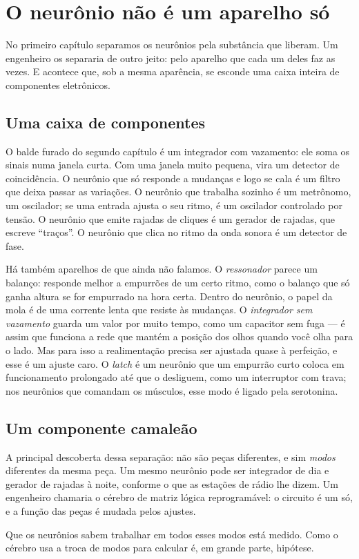 \chapter{O neurônio não é um aparelho só}

No primeiro capítulo separamos os neurônios pela substância que liberam. Um engenheiro os separaria de outro jeito: pelo aparelho que cada um deles faz as vezes. E acontece que, sob a mesma aparência, se esconde uma caixa inteira de componentes eletrônicos.

\section*{Uma caixa de componentes}

O balde furado do segundo capítulo é um integrador com vazamento: ele soma os sinais numa janela curta. Com uma janela muito pequena, vira um detector de coincidência. O neurônio que só responde a mudanças e logo se cala é um filtro que deixa passar as variações. O neurônio que trabalha sozinho é um metrônomo, um oscilador; se uma entrada ajusta o seu ritmo, é um oscilador controlado por tensão. O neurônio que emite rajadas de cliques é um gerador de rajadas, que escreve ``traços''. O neurônio que clica no ritmo da onda sonora é um detector de fase.


Há também aparelhos de que ainda não falamos. O \emph{ressonador} parece um balanço: responde melhor a empurrões de um certo ritmo, como o balanço que só ganha altura se for empurrado na hora certa. Dentro do neurônio, o papel da mola é de uma corrente lenta que resiste às mudanças. O \emph{integrador sem vazamento} guarda um valor por muito tempo, como um capacitor sem fuga --- é assim que funciona a rede que mantém a posição dos olhos quando você olha para o lado. Mas para isso a realimentação precisa ser ajustada quase à perfeição, e esse é um ajuste caro. O \emph{latch} é um neurônio que um empurrão curto coloca em funcionamento prolongado até que o desliguem, como um interruptor com trava; nos neurônios que comandam os músculos, esse modo é ligado pela serotonina.

\section*{Um componente camaleão}

A principal descoberta dessa separação: não são peças diferentes, e sim \emph{modos} diferentes da mesma peça. Um mesmo neurônio pode ser integrador de dia e gerador de rajadas à noite, conforme o que as estações de rádio lhe dizem. Um engenheiro chamaria o cérebro de matriz lógica reprogramável: o circuito é um só, e a função das peças é mudada pelos ajustes.

Que os neurônios sabem trabalhar em todos esses modos está medido. Como o cérebro usa a troca de modos para calcular é, em grande parte, hipótese.

